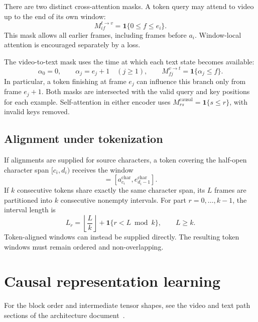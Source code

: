 \documentclass[11pt,a4paper]{article}
\newcommand{\ind}{\mathbf{1}}
\numberwithin{equation}{section}
\begin{document}
There are two distinct cross-attention masks. A token query may attend
to video up to the end of its own window:
\begin{equation}
M^{t\to v}_{if}=\ind\{0\leq f\leq e_i\}.
\label{eq:t2v}
\end{equation}
This mask allows all earlier frames, including frames before $a_i$.
Window-local attention is encouraged separately by a loss.

The video-to-text mask uses the time at which each text state becomes
available:
\begin{equation}
\alpha_0=0,\qquad \alpha_j=e_j+1\quad(j\geq1),
\qquad
M^{v\to t}_{fj}=\ind\{\alpha_j\leq f\}.
\label{eq:v2t}
\end{equation}
In particular, a token finishing at frame $e_j$ can influence this
branch only from frame $e_j+1$. Both masks are intersected with the
valid query and key positions for each example. Self-attention in
either encoder uses $M^{\mathrm{causal}}_{rs}=\ind\{s\leq r\}$, with
invalid keys removed.

\subsection{Alignment under tokenization}

If alignments are supplied for source characters, a token covering the
half-open character span $[c_i,d_i)$ receives the window
\begin{equation}
[a_i,e_i]=[a^{\mathrm{char}}_{c_i},
            e^{\mathrm{char}}_{d_i-1}].
\end{equation}
If $k$ consecutive tokens share exactly the same character span, its
$L$ frames are partitioned into $k$ consecutive nonempty intervals.
For part $r=0,\ldots,k-1$, the interval length is
\begin{equation}
L_r=\left\lfloor\frac{L}{k}\right\rfloor
       +\ind\{r<L\bmod k\},\qquad L\geq k.
\end{equation}
Token-aligned windows can instead be supplied directly. The resulting
token windows must remain ordered and non-overlapping.

\section{Causal representation learning}

For the block order and intermediate tensor shapes, see the video and text
path sections of the architecture document~\cite{architecture}.
\end{document}

